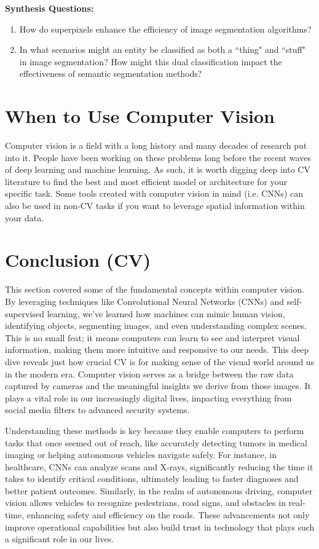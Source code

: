 \vspace{10bp}
\begin{questionbox}
    \textbf{Synthesis Questions:}
    \begin{enumerate}    
        \item How do superpixels enhance the efficiency of image segmentation algorithms?
        \item In what scenarios might an entity be classified as both a ``thing" and ``stuff" in image segmentation? How might this dual classification impact the effectiveness of semantic segmentation methods?
    \end{enumerate}
    \vspace{1bp}
\end{questionbox}

\section{When to Use Computer Vision}
    \large Computer vision is a field with a long history and many decades of research put into it. People have been working on these problems long before the recent waves of deep learning and machine learning. As such, it is worth digging deep into CV literature to find the best and most efficient model or architecture for your specific task. Some tools created with computer vision in mind (i.e. CNNs) can also be used in non-CV tasks if you want to leverage spatial information within your data.

\section{Conclusion (CV)}
    \large 
    This section covered some of the fundamental concepts within computer vision. By leveraging techniques like Convolutional Neural Networks (CNNs) and self-supervised learning, we’ve learned how machines can mimic human vision, identifying objects, segmenting images, and even understanding complex scenes. This is no small feat; it means computers can learn to see and interpret visual information, making them more intuitive and responsive to our needs. This deep dive reveals just how crucial CV is for making sense of the visual world around us in the modern era. Computer vision serves as a bridge between the raw data captured by cameras and the meaningful insights we derive from those images. It plays a vital role in our increasingly digital lives, impacting everything from social media filters to advanced security systems.  \break
    
    Understanding these methods is key because they enable computers to perform tasks that once seemed out of reach, like accurately detecting tumors in medical imaging or helping autonomous vehicles navigate safely. For instance, in healthcare, CNNs can analyze scans and X-rays, significantly reducing the time it takes to identify critical conditions, ultimately leading to faster diagnoses and better patient outcomes. Similarly, in the realm of autonomous driving, computer vision allows vehicles to recognize pedestrians, road signs, and obstacles in real-time, enhancing safety and efficiency on the roads. These advancements not only improve operational capabilities but also build trust in technology that plays such a significant role in our lives.

